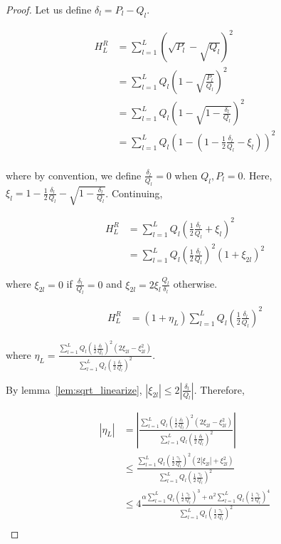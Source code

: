 \begin{proof}

Let us define $\delta_l = P_l - Q_l$. 

\begin{align*}
H^R_L &= \sum_{l=1}^L (\sqrt{P_l} - \sqrt{Q_l})^2 \\
   &= \sum_{l=1}^L Q_l \left( 1 - \sqrt{\frac{P_l}{Q_l}} \right)^2 \\
 &= \sum_{l=1}^L Q_l \left( 1 - \sqrt{1 - \frac{\delta_l}{Q_l}} \right)^2 \\
 &= \sum_{l=1}^L Q_l \left( 1 - \left( 1 - \frac{1}{2} \frac{\delta_l}{Q_l} - \xi_l \right) \right)^2 \\
\end{align*}

where by convention, we define $\frac{\delta_l}{Q_l} = 0$ when $Q_l, P_l = 0$. Here, $\xi_l = 1 - \frac{1}{2} \frac{\delta_l}{Q_l} - \sqrt{ 1 - \frac{\delta_l}{Q_l} }$. Continuing,

\begin{align*}
H^R_L &=  \sum_{l=1}^L Q_l \left(  \frac{1}{2} \frac{\delta_l}{Q_l} + \xi_l \right)^2 \\
  &=  \sum_{l=1}^L Q_l \left(  \frac{1}{2} \frac{\delta_l}{Q_l} \right)^2 \left( 1 + \xi_{2l} \right)^2 
\end{align*}

where $\xi_{2l} = 0$ if $\frac{\delta_l}{Q_l} = 0$ and $\xi_{2l} = 2 \xi_l \frac{Q_l}{\delta_l}$ otherwise.

\begin{align*}
H^R_L &= (1 + \eta_L) \sum_{l=1}^L Q_l \left( \frac{1}{2} \frac{\delta_l}{Q_l} \right)^2
\end{align*}

where $\eta_L = \frac{ \sum_{l=1}^L Q_l \left( \frac{1}{2} \frac{\delta_l}{Q_l} \right)^2 (2 \xi_{2l} - \xi_{2l}^2) }
          { \sum_{l=1}^L Q_l \left( \frac{1}{2} \frac{\delta_l}{Q_l} \right)^2 }$.

By lemma~\ref{lem:sqrt_linearize}, $|\xi_{2l}| \leq 2 \left| \frac{\delta_l}{Q_l} \right|$. Therefore,

\begin{align*}
|\eta_L| &= \left| \frac{ \sum_{l=1}^L Q_l \left( \frac{1}{2} \frac{\delta_l}{Q_l} \right)^2 (2 \xi_{2l} - \xi_{2l}^2) }
          { \sum_{l=1}^L Q_l \left( \frac{1}{2} \frac{\delta_l}{Q_l} \right)^2 } \right| \\
   &\leq  \frac{ \sum_{l=1}^L Q_l \left( \frac{1}{2} \frac{\gamma_l}{Q_l} \right)^2 (2 |\xi_{2l}| + \xi_{2l}^2) }
          { \sum_{l=1}^L Q_l \left( \frac{1}{2} \frac{\gamma_l}{Q_l} \right)^2 } \\
  &\leq   4 \frac{ \alpha \sum_{l=1}^L Q_l \left( \frac{1}{2} \frac{\gamma_l}{Q_l} \right)^3 +  
                   \alpha^2 \sum_{l=1}^L Q_l \left( \frac{1}{2} \frac{\gamma_l}{Q_l} \right)^4 }
          { \sum_{l=1}^L Q_l \left( \frac{1}{2} \frac{\gamma_l}{Q_l} \right)^2 } \\
\end{align*}


\end{proof}
